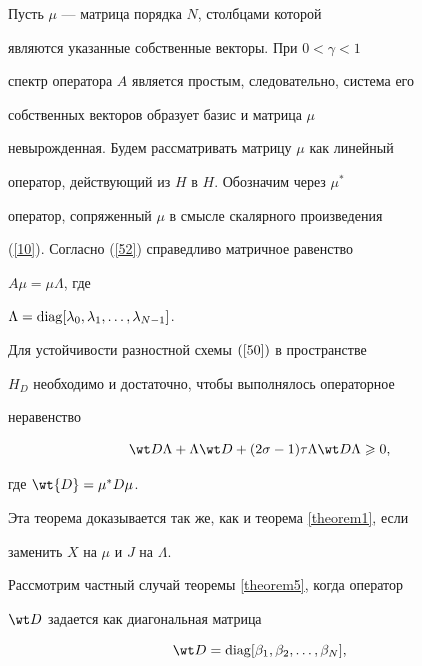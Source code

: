 Пусть $\mu $ --- матрица порядка $N$, столбцами которой


являются указанные собственные векторы. При $0 < \gamma < 1$


спектр оператора $A$ является простым, следовательно, система его


собственных векторов образует базис и матрица $\mu$


невырожденная. Будем рассматривать матрицу $\mu $ как линейный


оператор, действующий из $H$ в $H$. Обозначим через $\mu^*$


оператор, сопряженный $\mu $ в смысле скалярного произведения


(\ref{10}). Согласно (\ref{52}) справедливо матричное равенство 


$A\mu=\mu \Lambda$, где 


$\Lambda=\operatorname{diag}[\lambda_0,\lambda_1,\dotsc,\lambda_{N-1} ]$.





\begin{thm}\label{theorem5}


Для устойчивости разностной схемы $(\ref{50})$ в пространстве


$H_{D}$ необходимо и достаточно, чтобы выполнялось операторное


неравенство


\begin{equation}\label{56}


\wt D\Lambda+\Lambda \wt D+(2\sigma-1)\tau \Lambda


\wt D\Lambda \geqslant 0,


\end{equation}


где $ \wt{D}=\mu^{*}D\mu $.


\end{thm}





Эта теорема доказывается так же, как и теорема \ref{theorem1}, если


заменить $X$ на $\mu $ и $J$ на $\Lambda $.





Рассмотрим частный случай теоремы \ref{theorem5}, когда оператор


${\wt D}$ задается как диагональная матрица


\begin{equation}\label{57}


\wt D=\diag[\beta_1,\beta_2,\dotsc,\beta_N ],


\end{equation}



